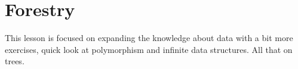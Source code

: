 \section{Forestry}
This lesson is focused on expanding the knowledge about data with a bit more
exercises, quick look at polymorphism and infinite data structures. All that on
trees.
